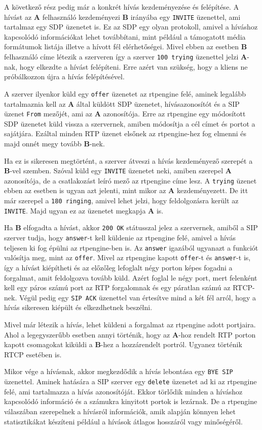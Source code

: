 A következő rész pedig már a konkrét hívás kezdeményezése és felépítése. A hívást az 
\textbf{A} felhasználó kezdeményezi \textbf{B} irányába egy \texttt{INVITE} üzenettel, 
ami tartalmaz egy SDP üzenetet is. Ez az SDP egy olyan protokoll, amivel a híváshoz 
kapcsolódó információkat lehet továbbítani, mint például a támogatott média formátumok 
listája illetve a hívott fél elérhetőségei. Mivel ebben az esetben \textbf{B} felhasználó 
címe létezik a szerveren így a szerver \texttt{100 trying} üzenettel jelzi 
\textbf{A}-nak, hogy elkezdte a hívást felépíteni. Erre azért van szükség, hogy a kliens 
ne próbálkozzon újra a hívás felépítésével.

A szerver ilyenkor küld egy \texttt{offer} üzenetet az rtpengine felé, aminek legalább 
tartalmaznia kell az \textbf{A} által küldött SDP üzenetet, hívásazonosítót és a SIP 
üzenet \texttt{From} mezőjét, ami az \textbf{A} azonosítója. Erre az rtpengine egy 
módosított SDP üzenetet küld vissza a szervernek, amiben módosítja a cél címet és portot 
a sajátjára. Ezáltal minden RTP üzenet elsőnek az rtpengine-hez fog elmenni és majd onnét 
megy tovább \textbf{B}-nek.

Ha ez is sikeresen megtörtént, a szerver átveszi a hívás kezdeményező szerepét a 
\textbf{B}-vel szemben. Szóval küld egy \texttt{INVITE} üzenetet neki, amiben szerepel 
\textbf{A} azonosítója, de a csatlakozást leíró mező az rtpengine címe lesz. A 
\texttt{trying} üzenet ebben az esetben is ugyan azt jelenti, mint mikor az \textbf{A} 
kezdeményezett. De itt már szerepel a \texttt{180 ringing}, amivel lehet jelzi, hogy 
feldolgozásra került az \texttt{INVITE}. Majd ugyan ez az üzenetet megkapja \textbf{A} 
is. 

Ha \textbf{B} elfogadta a hívást, akkor \texttt{200 OK} státusszal jelez a szervernek, 
amiből a SIP szerver tudja, hogy \texttt{answer}-t kell küldenie az rtpengine felé, 
amivel a hívás teljesen ki fog épülni az rtpengine-ben is. Az \texttt{answer} igazából 
ugyanazt a funkciót valósítja meg, mint az \texttt{offer}. Mivel az rtpengine kapott 
\texttt{offer}-t és \texttt{answer}-t is, így a hívást kiépítheti és az előzőleg 
lefoglalt négy porton képes fogadni a forgalmat, amit feldolgozva tovább küld. Azért 
foglal le négy port, mert felenként kell egy páros számú port az RTP forgalomnak és egy 
páratlan számú az RTCP-nek. Végül pedig egy \texttt{SIP ACK} üzenettel van értesítve mind 
a két fél arról, hogy a hívás sikeresen kiépült és elkezdhetnek beszélni. 

Mivel már létezik a hívás, lehet küldeni a forgalmat az rtpengine adott 
portjaira. Ahol a legegyszerűbb esetben annyi történik, hogy az \textbf{A}-hoz rendelt
RTP porton kapott csomagokat kiküldi a \textbf{B}-hez a hozzárendelt portról. Ugyanez
történik RTCP esetében is. 

Mikor vége a hívásnak, akkor megkezdődik a hívás lebontása egy \texttt{BYE SIP} 
üzenettel. Aminek hatására a SIP szerver egy \texttt{delete} üzenetet ad ki az rtpengine 
felé, ami tartalmazza a hívás azonosítóját. Ekkor törlődik minden a híváshoz kapcsolódó 
információ és a számukra kinyitott portok is lezárnak. De a rtpengine válaszában 
szerepelnek a hívásról információk, amik alapján könnyen lehet statisztikákat készíteni 
például a hívások átlagos hosszáról vagy minőségéről.